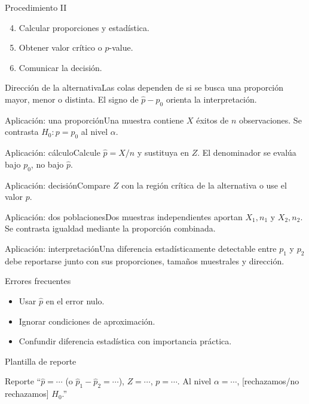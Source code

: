 \documentclass[10pt,aspectratio=169]{beamer}
\begin{document}
\begin{frame}{Procedimiento II}\small\begin{enumerate}\setcounter{enumi}{3}\item Calcular proporciones y estadística.\item Obtener valor crítico o $p$-value.\item Comunicar la decisión.\end{enumerate}\end{frame}
\begin{frame}{Dirección de la alternativa}\small Las colas dependen de si se busca una proporción mayor, menor o distinta. El signo de $\hat p-p_0$ orienta la interpretación.\end{frame}
\begin{frame}{Aplicación: una proporción}\small Una muestra contiene $X$ éxitos de $n$ observaciones. Se contrasta $H_0:p=p_0$ al nivel $\alpha$.\end{frame}
\begin{frame}{Aplicación: cálculo}\small Calcule $\hat p=X/n$ y sustituya en $Z$. El denominador se evalúa bajo $p_0$, no bajo $\hat p$.\end{frame}
\begin{frame}{Aplicación: decisión}\small Compare $Z$ con la región crítica de la alternativa o use el valor $p$.\end{frame}
\begin{frame}{Aplicación: dos poblaciones}\small Dos muestras independientes aportan $X_1,n_1$ y $X_2,n_2$. Se contrasta igualdad mediante la proporción combinada.\end{frame}
\begin{frame}{Aplicación: interpretación}\small Una diferencia estadísticamente detectable entre $p_1$ y $p_2$ debe reportarse junto con sus proporciones, tamaños muestrales y dirección.\end{frame}
\begin{frame}{Errores frecuentes}\small\begin{itemize}\item Usar $\hat p$ en el error nulo.\item Ignorar condiciones de aproximación.\item Confundir diferencia estadística con importancia práctica.\end{itemize}\end{frame}
\begin{frame}{Plantilla de reporte}\small\begin{block}{Reporte} ``$\hat p=\cdots$ (o $\hat p_1-\hat p_2=\cdots$), $Z=\cdots$, $p=\cdots$. Al nivel $\alpha=\cdots$, [rechazamos/no rechazamos] $H_0$.''\end{block}\end{frame}
\end{document}
